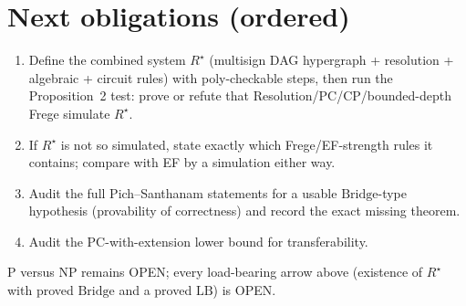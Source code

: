 \documentclass[11pt]{article}
\theoremstyle{remark}
\newcommand{\Bridge}{\mathrm{Bridge}}
\begin{document}
\section{Next obligations (ordered)}
\begin{enumerate}
\item Define the combined system $R^\star$ (multisign DAG hypergraph + resolution + algebraic + circuit rules) with poly-checkable steps, then run the Proposition~2 test: prove or refute that Resolution/PC/CP/bounded-depth Frege simulate $R^\star$.
\item If $R^\star$ is not so simulated, state exactly which Frege/EF-strength rules it contains; compare with EF by a simulation either way.
\item Audit the full Pich--Santhanam statements for a usable $\Bridge$-type hypothesis (provability of correctness) and record the exact missing theorem.
\item Audit the PC-with-extension lower bound for transferability.
\end{enumerate}
P versus NP remains OPEN; every load-bearing arrow above (existence of $R^\star$ with proved $\Bridge$ and a proved $\mathrm{LB}$) is OPEN.
\end{document}
